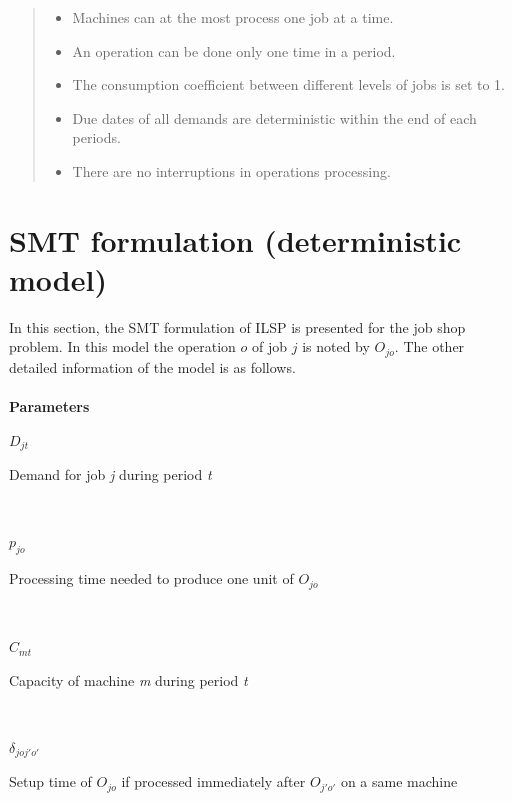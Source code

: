 \documentclass[letterpaper]{article} %
\begin{document}
\begin{quote}
\begin{itemize}
\item Machines can at the most process one job at a time.
\item An operation can be done only one time in a period.
\item The consumption coefficient between different levels of jobs is set to 1.
\item Due dates of all demands are deterministic within the end of each periods.
\item There are no interruptions in operations processing.
\end{itemize}
\end{quote}

\section{SMT formulation (deterministic model)}
In this section, the SMT formulation of ILSP is presented for the job shop problem. In this model the operation $o$ of job $j$ is noted by \textit{$O_{jo}$}. The other detailed information of the model is as follows.\\\\

\textbf{Parameters}\\
\parbox{30pt}{\textit{$D_{jt}$}} 
\parbox[t]{207pt}{Demand for job \textit{j} during period \textit{t}}\\
\parbox{30pt}{\textit{$p_{jo}$}} 
\parbox[t]{207pt}{Processing time needed to produce one unit of $O_{jo}$}\\
\parbox{30pt}{\textit{$C_{mt}$}} 
\parbox[t]{207pt}{Capacity of machine \textit{m} during period \textit{t}}\\
\parbox{30pt}{\textit{$\delta_{joj'o'}$}} 
\parbox[t]{207pt}{Setup time of $O_{jo}$ if processed immediately after $O_{j'o'}$ on a same machine}\\
\end{document}
